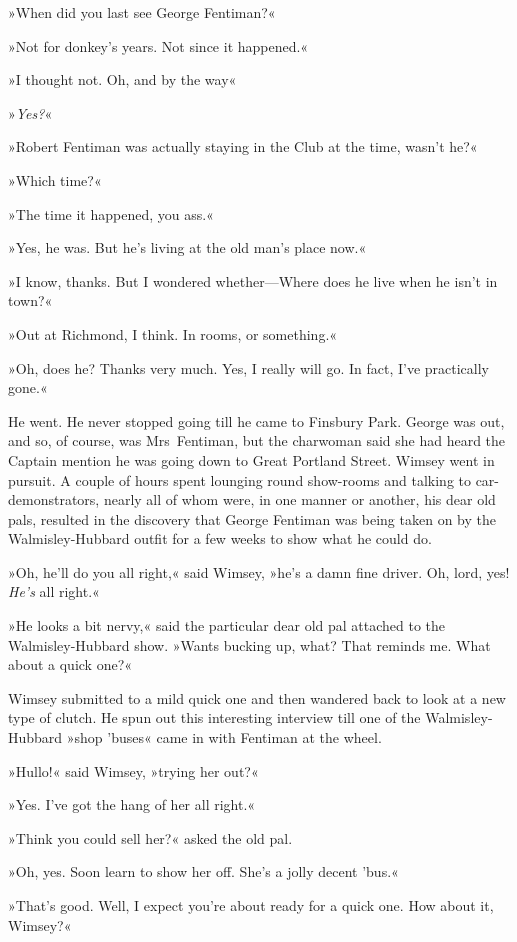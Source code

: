 »When did you last see George Fentiman?«

»Not for donkey's years. Not since it happened.«

»I thought not. Oh, and by the way\longdash«

»\textit{Yes?}«

»Robert Fentiman was actually staying in the Club at the time, wasn't he?«

»Which time?«

»The time it happened, you ass.«

»Yes, he was. But he's living at the old man's place now.«

»I know, thanks. But I wondered whether—Where does he live when he isn't in town?«

»Out at Richmond, I think. In rooms, or something.«

»Oh, does he? Thanks very much. Yes, I really will go. In fact, I've practically gone.«

He went. He never stopped going till he came to Finsbury Park. George was out, and so, of course, was Mrs~Fentiman, but the charwoman said she had heard the Captain mention he was going down to Great Portland Street. Wimsey went in pursuit. A couple of hours spent lounging round show-rooms and talking to car-demonstrators, nearly all of whom were, in one manner or another, his dear old pals, resulted in the discovery that George Fentiman was being taken on by the Walmisley-Hubbard outfit for a few weeks to show what he could do.

»Oh, he'll do you all right,« said Wimsey, »he's a damn fine driver. Oh, lord, yes! \textit{He's} all right.«

»He looks a bit nervy,« said the particular dear old pal attached to the Walmisley-Hubbard show. »Wants bucking up, what? That reminds me. What about a quick one?«

Wimsey submitted to a mild quick one and then wandered back to look at a new type of clutch. He spun out this interesting interview till one of the Walmisley-Hubbard »shop 'buses« came in with Fentiman at the wheel.

»Hullo!« said Wimsey, »trying her out?«

»Yes. I've got the hang of her all right.«

»Think you could sell her?« asked the old pal.

»Oh, yes. Soon learn to show her off. She's a jolly decent 'bus.«

»That's good. Well, I expect you're about ready for a quick one. How about it, Wimsey?«


